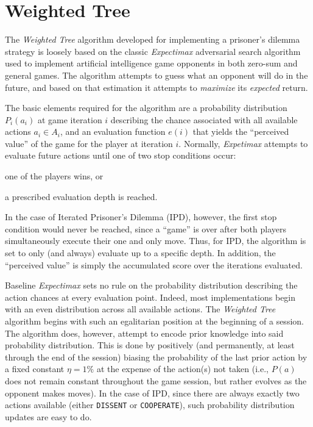 \documentclass[10pt]{article}
\begin{document}
\lstset{
  basicstyle=\footnotesize\ttfamily
}

\section{Weighted Tree}
The \emph{Weighted Tree} algorithm developed for implementing a prisoner's dilemma strategy is loosely based on the classic \emph{Expectimax} adversarial search algorithm used to implement artificial intelligence game opponents in both zero-sum and general games. The algorithm attempts to guess what an opponent will do in the future, and based on that estimation it attempts to \emph{maximize} its \emph{expected} return.\par

The basic elements required for the algorithm are a probability distribution $P_i(a_i)$ at game iteration $i$ describing the chance associated with all available actions $a_i \in A_i$, and an evaluation function $e(i)$ that yields the ``perceived value'' of the game for the player at iteration $i$. Normally, \emph{Expetimax} attempts to evaluate future actions until one of two stop conditions occur:
\begin{enumerate*}[(1)]
    \item one of the players wins, or
    \item a prescribed evaluation depth is reached.
\end{enumerate*}
In the case of Iterated Prisoner's Dilemma (IPD), however, the first stop condition would never be reached, since a ``game'' is over after both players simultaneously execute their one and only move. Thus, for IPD, the algorithm is set to only (and always) evaluate up to a specific depth. In addition, the ``perceived value'' is simply the accumulated score over the iterations evaluated.\par

Baseline \emph{Expectimax} sets no rule on the probability distribution describing the action chances at every evaluation point. Indeed, most implementations begin with an even distribution across all available actions. The \emph{Weighted Tree} algorithm begins with such an egalitarian position at the beginning of a session. The algorithm does, however, attempt to encode prior knowledge into said probability distribution. This is done by positively (and permanently, at least through the end of the session) biasing the probability of the last prior action by a fixed constant $\eta = 1\%$ at the expense of the action(s) not taken (i.e., $P(a)$ does not remain constant throughout the game session, but rather evolves as the opponent makes moves). In the case of IPD, since there are always exactly two actions available (either \texttt{DISSENT} or \texttt{COOPERATE}), such probability distribution updates are easy to do.\par
\end{document}
